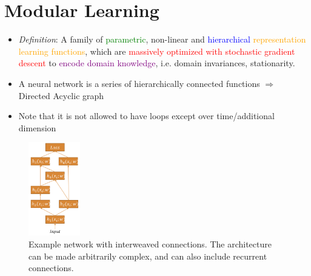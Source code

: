\section{Modular Learning}
\begin{itemize}
	\item \textit{Definition}: A family of \textcolor{green}{parametric}, \textcolor{lightred}{non-linear} and \textcolor{blue}{hierarchical} \textcolor{orange}{representation learning functions}, which are \textcolor{red}{massively optimized with stochastic gradient descent} to \textcolor{purple}{encode domain knowledge}, i.e. domain invariances, stationarity.
	\item A neural network is a series of hierarchically connected functions $\Rightarrow$ Directed Acyclic graph
	\item Note that it is not allowed to have loops except over time/additional dimension
\end{itemize}
\begin{figure}[ht!]
	\centering
	\includegraphics[width=0.2\textwidth]{figures/modularity_example_network.png}
	\caption{Example network with interweaved connections. The architecture can be made arbitrarily complex, and can also include recurrent connections.}
	\label{fig:modularity_example_network}
\end{figure}
